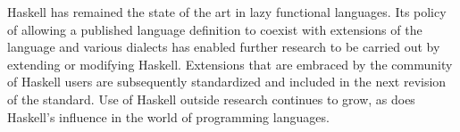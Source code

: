Haskell has remained the state of the art in lazy functional languages. Its policy of allowing a published language definition to coexist with extensions of the language and various dialects has enabled further research to be carried out by extending or modifying Haskell. Extensions that are embraced by the community of Haskell users are subsequently standardized and included in the next revision of the standard. Use of Haskell outside research continues to grow, as does Haskell's influence in the world of programming languages.